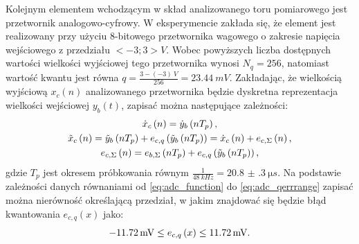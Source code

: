 Kolejnym elementem wchodzącym w skład analizowanego toru pomiarowego jest przetwornik analogowo-cyfrowy. W eksperymencie zakłada się, że element jest realizowany przy użyciu 8-bitowego przetwornika wagowego o zakresie napięcia wejściowego z przedziału $<-3;3>\unit{V}$. Wobec powyższych liczba dostępnych wartości wielkości wyjściowej tego przetwornika wynosi $N_{q} = 256$, natomiast wartość kwantu jest równa $q = \frac{3 - (-3) ~\unit{V}}{256} = \qty{23.44}{mV}$. Zakładając, że wielkością wyjściową $x_{c}(n)$ analizowanego przetwornika będzie dyskretna reprezentacja wielkości wejściowej $y_{b}(t)$, zapisać można następujące zależności:
\begin{gather}
\dot{x}_{c} \left(n\right) = \dot{y}_{b} \left(nT_{p}\right) \label{eq:sym_partc_out_ideal}, \\
\tilde{x}_{c} \left(n\right) = \tilde{y}_{b} \left(nT_{p}\right) + e_{c,q} \left( \tilde{y}_{b} \left(nT_{p}\right) \right) = \dot{x}_{c} \left(n\right) + e_{c,\Sigma} \left(n\right) \label{eq:sym_partc_out_real}, \\
e_{c,\Sigma} \left(n\right) = e_{b,\Sigma} \left(nT_{p}\right) + e_{c,q} \left( \tilde{y}_{b} \left(nT_{p}\right) \right) \label{eq:sym_partc_error_sum},
\end{gather}
gdzie $T_{p}$ jest okresem próbkowania równym $\frac{1}{\qty{48}{kHz}} = \qty{20.8(3)}{\micro s}$.
Na podstawie zależności danych równaniami od \eqref{eq:adc_function} do \eqref{eq:adc_qerrrange} zapisać można nierówność określającą przedział, w jakim znajdować się będzie błąd kwantowania $e_{c,q}(x)$ jako:
\begin{equation}
\qty{-11.72}{mV} \le e_{c,q} \left(x\right) \le \qty{11.72}{mV} \label{eq:sym_partc_error_quant}.
\end{equation}

